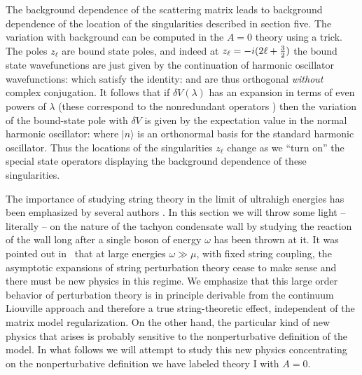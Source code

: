 The background dependence of the scattering matrix leads to
background dependence of 
the location of the singularities described in section five. 
The variation with background can be computed in the $A=0$ theory 
using a trick. The poles $z_\ell$ are bound state poles, and 
indeed at $z_\ell=-i(2\ell + {3\over 2})$ the bound state 
wavefunctions are just given by the continuation of harmonic
oscillator wavefunctions:
\eqn{}
which satisfy the identity:
\eqn{}
and are thus orthogonal {\it without} complex conjugation.
It follows that if $\delta V(\lambda)$ has an expansion in terms of even 
powers of $\lambda$ (these correspond to the nonredundant operators
)
then the variation of the bound-state pole with $\delta V$ is given 
by the expectation value in the normal harmonic oscillator:
\eqn{}
where $|n\rangle$ is an orthonormal basis for the standard 
harmonic oscillator.
Thus the locations of the singularities $z_\ell$ change as we 
``turn on'' the special state operators displaying the 
background dependence of these singularities.
 
 
The importance of studying string theory in the limit of
ultrahigh energies has been emphasized by several authors
\nref{}%
\nref{}%
\nref{}%
\nref{}%
\nref{}%
.
In this section we will throw some light -- literally
-- on the
nature of the tachyon condensate wall by studying the
reaction of the wall long after a single boson of energy $\omega$
has been thrown at it. It was pointed out in \moore\ that 
at large energies $\omega\gg \mu$, with fixed string coupling, the asymptotic 
expansions of string perturbation theory cease to make sense and 
there must be new physics in this regime. We emphasize that this large order
behavior of perturbation theory is in principle derivable from the 
continuum Liouville approach and therefore a true string-theoretic
effect, independent of the matrix model regularization. On the
other hand, 
the particular kind of new physics that arises is probably sensitive
to the nonperturbative definition of the model.
In what follows we will attempt to study this new physics concentrating on
the nonperturbative definition we have labeled
theory I with $A=0$.  
 
